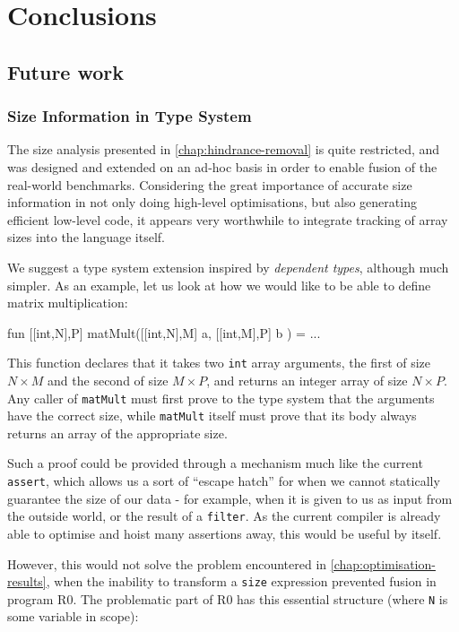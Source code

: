 \chapter{Conclusions}
\label{chap:conclusions}

\section{Future work}
\label{sec:future-work}

\subsection{Size Information in Type System}

The size analysis presented in \cref{chap:hindrance-removal} is quite
restricted, and was designed and extended on an ad-hoc basis in order
to enable fusion of the real-world benchmarks.  Considering the great
importance of accurate size information in not only doing high-level
optimisations, but also generating efficient low-level code, it
appears very worthwhile to integrate tracking of array sizes into the
language itself.

We suggest a type system extension inspired by \textit{dependent
  types}, although much simpler.  As an example, let us look at how we
would like to be able to define matrix multiplication:

\begin{colorcode}
fun [[int,N],P] matMult([[int,N],M] a, [[int,M],P] b ) =
  ...
\end{colorcode}

This function declares that it takes two \texttt{int} array arguments,
the first of size $N \times M$ and the second of size $M \times P$,
and returns an integer array of size $N \times P$.  Any caller of
\texttt{matMult} must first prove to the type system that the
arguments have the correct size, while \texttt{matMult} itself must
prove that its body always returns an array of the appropriate size.

Such a proof could be provided through a mechanism much like the
current \texttt{assert}, which allows us a sort of ``escape hatch''
for when we cannot statically guarantee the size of our data - for
example, when it is given to us as input from the outside world, or
the result of a \texttt{filter}.  As the current \LO{} compiler is
already able to optimise and hoist many assertions away, this would be
useful by itself.

However, this would not solve the problem encountered in
\cref{chap:optimisation-results}, when the inability to transform a
\texttt{size} expression prevented fusion in program R0.  The
problematic part of R0 has this essential structure (where \texttt{N}
is some variable in scope):

